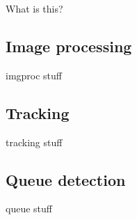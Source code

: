 What is this?

\subsection{Image processing}
imgproc stuff

\subsection{Tracking}
tracking stuff

\subsection{Queue detection}
queue stuff

